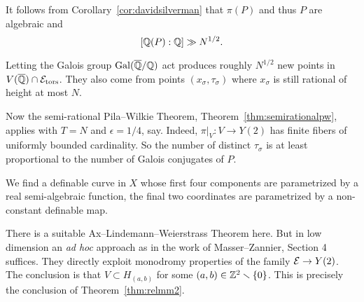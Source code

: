 It follows from Corollary~\ref{cor:davidsilverman} that $\pi(P)$ and thus $P$ are
algebraic and
$$[{\mathbb{Q}}(P):{\mathbb{Q}}]\gg N^{1/2}.$$

Letting the Galois group $\mathrm{Gal}({\overline{\mathbb{Q}}}/{\mathbb{Q}})$ act produces
roughly $N^{1/2}$ new points in $V({\overline{\mathbb{Q}}})\cap
\mathcal{E}_{\mathrm{tors}}$. They also come from points
$(x_\sigma,\tau_\sigma)$ where $x_\sigma$ is still rational of height
at most $N$.

Now the semi-rational Pila--Wilkie Theorem,
Theorem~\ref{thm:semirationalpw}, applies with $T=N$ and $\epsilon
=1/4$, say. Indeed, $\pi|_V\colon V\rightarrow Y(2)$ has finite
fibers of uniformly bounded cardinality.
So the number of distinct $\tau_\sigma$ is at least
proportional to the number of Galois conjugates of $P$.


We find a definable curve  in $X$ whose
first four components are parametrized by a real semi-algebraic
function, the final two
coordinates are parametrized by a  non-constant definable map. 

There is a suitable Ax--Lindemann--Weierstrass Theorem here. But in low
dimension an \textit{ad hoc} approach as in the work of
Masser--Zannier, Section 4~\cite{MZ:AJM10} suffices. They directly
exploit monodromy properties of the family ${\mathcal E}\rightarrow Y(2)$. The
conclusion is that $V\subset H_{(a,b)}$ for some
$(a,b)\in{\mathbb{Z}}^2\smallsetminus\{0\}$. This is precisely the conclusion of Theorem~\ref{thm:relmm2}.


